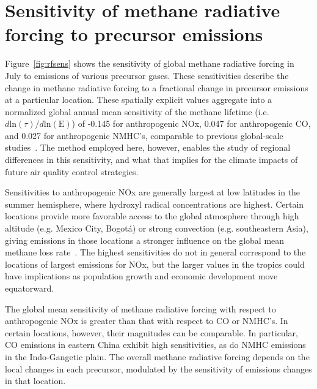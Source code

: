 \section{Sensitivity of methane radiative forcing to precursor emissions}

Figure~\ref{fig:rfsens} shows the sensitivity of global methane radiative forcing in July to emissions of various precursor gases. These sensitivities describe the change in methane radiative forcing to a fractional change in precursor emissions at a particular location. These spatially explicit values aggregate into a normalized global annual mean sensitivity of the methane lifetime (i.e. $d \mathrm{ln}(\tau)/d\mathrm{ln}(\mathrm{E})$) of -0.145 for anthropogenic NOx, 0.047 for anthropogenic CO, and 0.027 for anthropogenic NMHC's, comparable to previous global-scale studies~\citep{ref:fry2012,ref:holmes2013}. The method employed here, however, enables the study of regional differences in this sensitivity, and what that implies for the climate impacts of future air quality control strategies.


Sensitivities to anthropogenic NOx are generally largest at low latitudes in the summer hemisphere, where hydroxyl radical concentrations are highest. Certain locations provide more favorable access to the global atmosphere through high altitude (e.g. Mexico City, Bogot\'a) or strong convection (e.g. southeastern Asia), giving emissions in those locations a stronger influence on the global mean methane loss rate~\citep{ref:bowman2012}. The highest sensitivities do not in general correspond to the locations of largest emissions for NOx, but the larger values in the tropics could have implications as population growth and economic development move equatorward.


The global mean sensitivity of methane radiative forcing with respect to anthropogenic NOx is greater than that with respect to CO or NMHC's. In certain locations, however, their magnitudes can be comparable. In particular, CO emissions in eastern China exhibit high sensitivities, as do NMHC emissions in the Indo-Gangetic plain. The overall methane radiative forcing depends on the local changes in each precursor, modulated by the sensitivity of emissions changes in that location.

